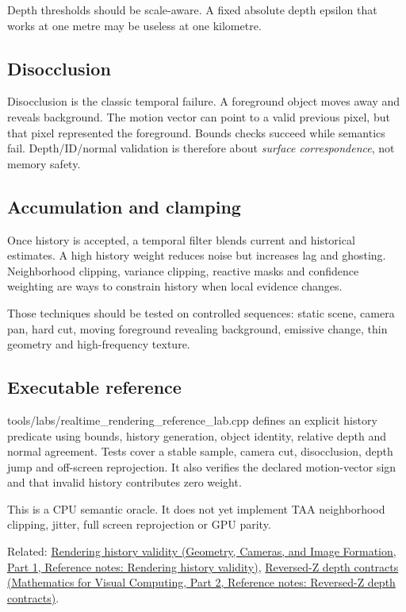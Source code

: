 Depth thresholds should be scale-aware. A fixed absolute depth epsilon that works at one metre may be useless at one kilometre.

\subsection{Disocclusion}\label{appendix-e8c352e39466-disocclusion}

\hypertarget{appendix-e8c352e39466-disocclusion}{}

Disocclusion is the classic temporal failure. A foreground object moves away and reveals background. The motion vector can point to a valid previous pixel, but that pixel represented the foreground. Bounds checks succeed while semantics fail. Depth/ID/normal validation is therefore about \emph{surface correspondence}, not memory safety.

\subsection{Accumulation and clamping}\label{appendix-e8c352e39466-accumulation-and-clamping}

\hypertarget{appendix-e8c352e39466-accumulation-and-clamping}{}

Once history is accepted, a temporal filter blends current and historical estimates. A high history weight reduces noise but increases lag and ghosting. Neighborhood clipping, variance clipping, reactive masks and confidence weighting are ways to constrain history when local evidence changes.

Those techniques should be tested on controlled sequences: static scene, camera pan, hard cut, moving foreground revealing background, emissive change, thin geometry and high-frequency texture.

\subsection{Executable reference}\label{appendix-e8c352e39466-executable-reference}

\hypertarget{appendix-e8c352e39466-executable-reference}{}

tools/labs/realtime\_rendering\_reference\_lab.cpp defines an explicit history predicate using bounds, history generation, object identity, relative depth and normal agreement. Tests cover a stable sample, camera cut, disocclusion, depth jump and off-screen reprojection. It also verifies the declared motion-vector sign and that invalid history contributes zero weight.

This is a CPU semantic oracle. It does not yet implement TAA neighborhood clipping, jitter, full screen reprojection or GPU parity.

Related: \href{../03-Geometry-Cameras-and-Image-Formation-P01/main.pdf\#nameddest=appendix-2e7e9fd28a2c}{Rendering history validity (Geometry, Cameras, and Image Formation, Part 1, Reference notes: Rendering history validity)}, \href{../02-Mathematics-for-Visual-Computing-P02/main.pdf\#nameddest=appendix-275ec8847057}{Reversed-Z depth contracts (Mathematics for Visual Computing, Part 2, Reference notes: Reversed-Z depth contracts)}.
